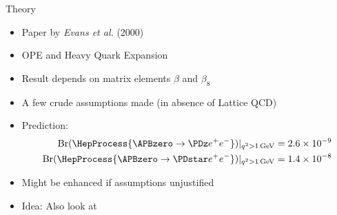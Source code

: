 \documentclass[compress,aspectratio=1610]{beamer}
\begin{document}
\begin{frame}{Theory}
  \begin{minipage}{0.75\textwidth}
  \begin{itemize}
    \item Paper by \textit{Evans et al.} (2000)
    \item OPE and Heavy Quark Expansion
    \item Result depends on matrix elements $β$ and $β_8$
    \item A few crude assumptions made (in absence of Lattice QCD)
    \item Prediction:
      \begin{align*}
        \mathrm{Br}(\HepProcess{\APBzero \to \PDz e^+ e^-})|_{q^2 > \SI{1}{GeV}} &= \num{2.6e-9} \\
        \mathrm{Br}(\HepProcess{\APBzero \to \PDstar e^+ e^-})|_{q^2 > \SI{1}{GeV}} &= \num{1.4e-8}
      \end{align*}
    \item Might be enhanced if assumptions unjustified
    \item Idea: Also look at \PDstar
  \end{itemize}
  \end{minipage}
  \begin{minipage}{0.15\textwidth}
  \end{minipage}
\end{frame}
\end{document}
